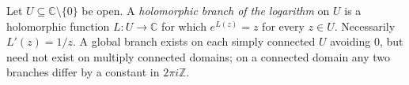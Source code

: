
Let $U\subseteq\mathbb C\setminus\{0\}$ be open. A \emph{holomorphic branch of the logarithm} on $U$ is a holomorphic function $L:U\to\mathbb C$ for which $e^{L(z)}=z$ for every $z\in U$. Necessarily $L'(z)=1/z$. A global branch exists on each simply connected $U$ avoiding $0$, but need not exist on multiply connected domains; on a connected domain any two branches differ by a constant in $2\pi i\mathbb Z$.
